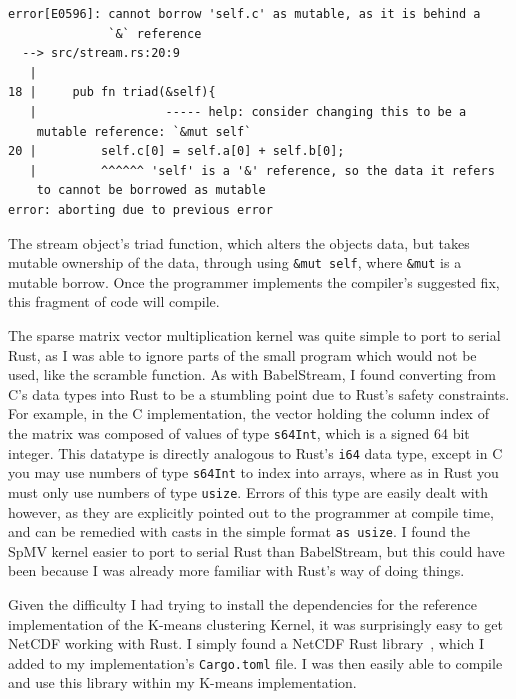 \begin{code}
\begin{verbatim}
error[E0596]: cannot borrow 'self.c' as mutable, as it is behind a
              `&` reference
  --> src/stream.rs:20:9
   |
18 |     pub fn triad(&self){
   |                  ----- help: consider changing this to be a
    mutable reference: `&mut self`
20 |         self.c[0] = self.a[0] + self.b[0];
   |         ^^^^^^ 'self' is a '&' reference, so the data it refers
    to cannot be borrowed as mutable
error: aborting due to previous error
\end{verbatim}
\label{lst:rustc-borrow}
\end{code}

The stream object's triad function, which alters the objects data, but takes mutable ownership of the data, through using \texttt{\&mut self}, where \texttt{\&mut} is a mutable borrow. Once the programmer implements the compiler's suggested fix, this fragment of code will compile.

The sparse matrix vector multiplication kernel was quite simple to port to serial Rust, as I was able to ignore parts of the small program which would not be used, like the scramble function. As with BabelStream, I found converting from C's data types into Rust to be a stumbling point due to Rust's safety constraints.
For example, in the C implementation, the vector holding the column index of the matrix was composed of values of type \texttt{s64Int}, which is a signed 64 bit integer. This datatype is directly analogous to Rust's \texttt{i64} data type, except in C you may use numbers of type \texttt{s64Int} to index into arrays, where as in Rust you must only use numbers of type \texttt{usize}. Errors of this type are easily dealt with however, as they are explicitly pointed out to the programmer at compile time, and can be remedied with casts in the simple format \texttt{as usize}. I found the SpMV kernel easier to port to serial Rust than BabelStream, but this could have been because I was already more familiar with Rust's way of doing things.

Given the difficulty I had trying to install the dependencies for the reference implementation of the K-means clustering Kernel, it was surprisingly easy to get NetCDF working with Rust. I simply found a NetCDF Rust library~\cite{RustNetCDF}, which I added to my implementation's \texttt{Cargo.toml} file. I was then easily able to compile and use this library within my K-means implementation.

